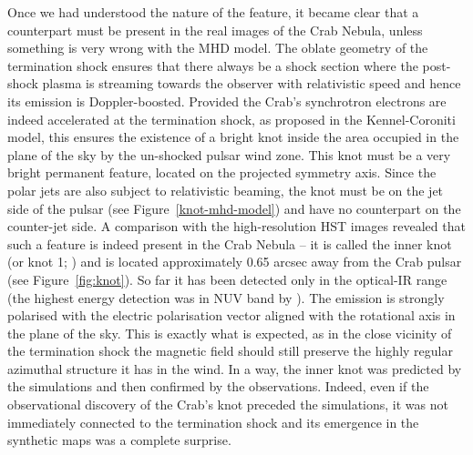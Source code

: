 Once we had understood the nature of the feature, it became clear that a counterpart must be present in the real images of the Crab Nebula, unless something is very wrong with the MHD model. The oblate geometry of the termination shock ensures that there always be a shock section where the post-shock plasma is streaming towards the observer with relativistic speed and hence its emission is Doppler-boosted.   Provided the Crab’s synchrotron electrons are indeed accelerated at the termination shock, as proposed in the Kennel-Coroniti model, this ensures the existence of a bright knot inside the area occupied in the plane of the sky by the un-shocked pulsar wind zone.  This knot must be a very bright permanent feature, located on the projected symmetry axis. Since the polar jets are also subject to relativistic beaming, the knot must be on the jet side of the pulsar (see Figure~\ref{knot-mhd-model}) and have no counterpart on the counter-jet side.      
A comparison with the high-resolution HST images revealed that such a feature is indeed present  in the Crab Nebula --
it is called the inner knot (or knot 1; \citet{hester-95}) and is located approximately 0.65 arcsec away from the Crab pulsar (see Figure~\ref{fig:knot}).  
So far it has been detected only in the optical-IR range (the highest energy detection was in NUV band by \cite{Melatos_2005}).  The emission is strongly polarised with the electric polarisation vector aligned with the rotational axis in the plane of the sky. This is exactly what is expected, as in the close vicinity of the termination shock the magnetic field should still preserve the highly regular azimuthal structure it has in the wind.  In a way, the inner knot was predicted by the simulations and then confirmed by the observations. Indeed, even if the observational discovery of the Crab's knot  preceded  the simulations, it was not immediately connected to the termination shock and its emergence in the synthetic maps was a complete surprise.      